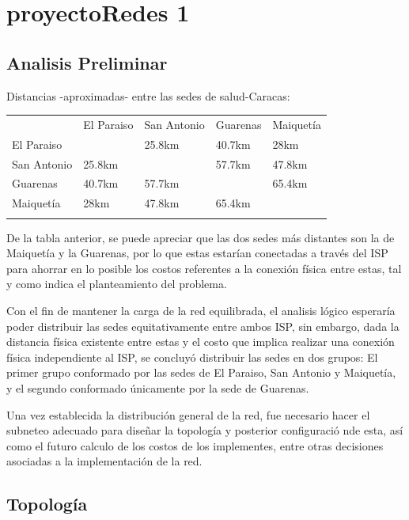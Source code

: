 \section{proyectoRedes 1}\label{proyectoredes-1}

\subsection{Analisis Preliminar}\label{analisis-preliminar}

Distancias -aproximadas- entre las sedes de salud-Caracas:

\begin{longtable}[c]{@{}lllll@{}}
\toprule\addlinespace
& El Paraiso & San Antonio & Guarenas & Maiquetía
\\\addlinespace
\midrule\endhead
El Paraiso & & 25.8km & 40.7km & 28km
\\\addlinespace
San Antonio & 25.8km & & 57.7km & 47.8km
\\\addlinespace
Guarenas & 40.7km & 57.7km & & 65.4km
\\\addlinespace
Maiquetía & 28km & 47.8km & 65.4km &
\\\addlinespace
\bottomrule
\end{longtable}

De la tabla anterior, se puede apreciar que las dos sedes más distantes
son la de Maiquetía y la Guarenas, por lo que estas estarían conectadas
a través del ISP para ahorrar en lo posible los costos referentes a la
conexión física entre estas, tal y como indica el planteamiento del
problema.

Con el fin de mantener la carga de la red equilibrada, el analisis
lógico esperaría poder distribuir las sedes equitativamente entre ambos
ISP, sin embargo, dada la distancia física existente entre estas y el
costo que implica realizar una conexión física independiente al ISP, se
concluyó distribuir las sedes en dos grupos: El primer grupo conformado
por las sedes de El Paraiso, San Antonio y Maiquetía, y el segundo
conformado únicamente por la sede de Guarenas.

Una vez establecida la distribución general de la red, fue necesario
hacer el subneteo adecuado para diseñar la topología y posterior
configuració nde esta, así como el futuro calculo de los costos de los
implementes, entre otras decisiones asociadas a la implementación de la
red.

\subsection{Topología}\label{topologuxeda}

